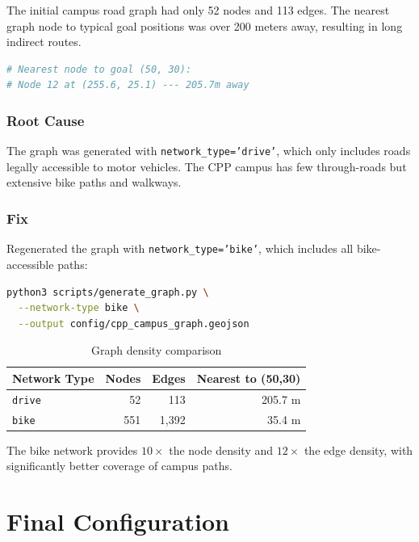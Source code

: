 \documentclass[11pt,a4paper]{article}
\begin{document}
The initial campus road graph had only 52 nodes and 113 edges. The nearest graph node to typical goal positions was over 200 meters away, resulting in long indirect routes.

\begin{lstlisting}[language=bash]
# Nearest node to goal (50, 30):
# Node 12 at (255.6, 25.1) --- 205.7m away
\end{lstlisting}

\subsubsection*{Root Cause}

The graph was generated with \texttt{network\_type='drive'}, which only includes roads legally accessible to motor vehicles. The CPP campus has few through-roads but extensive bike paths and walkways.

\subsubsection*{Fix}

Regenerated the graph with \texttt{network\_type='bike'}, which includes all bike-accessible paths:

\begin{lstlisting}[language=bash]
python3 scripts/generate_graph.py \
  --network-type bike \
  --output config/cpp_campus_graph.geojson
\end{lstlisting}

\begin{table}[h]
\centering
\caption{Graph density comparison}
\begin{tabular}{lrrr}
\toprule
\textbf{Network Type} & \textbf{Nodes} & \textbf{Edges} & \textbf{Nearest to (50,30)} \\
\midrule
\texttt{drive} & 52 & 113 & 205.7 m \\
\texttt{bike} & 551 & 1,392 & 35.4 m \\
\bottomrule
\end{tabular}
\end{table}

The bike network provides $10\times$ the node density and $12\times$ the edge density, with significantly better coverage of campus paths.

\section{Final Configuration}
\end{document}
